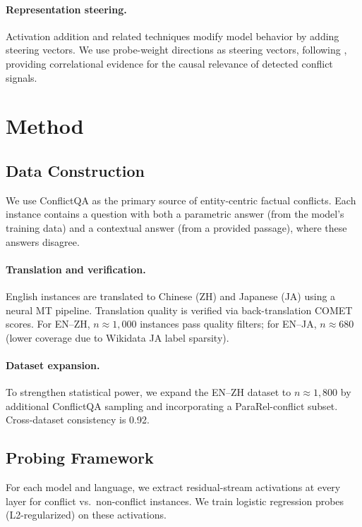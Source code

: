 \documentclass{article}
\begin{document}
\paragraph{Representation steering.}
Activation addition \citep{turner2023activation} and related techniques modify model behavior by adding steering vectors. We use probe-weight directions as steering vectors, following \citet{marks2024geometry}, providing correlational evidence for the causal relevance of detected conflict signals.

\section{Method}
\label{sec:method}

\subsection{Data Construction}

We use ConflictQA \citep{xie2024adaptive} as the primary source of entity-centric factual conflicts. Each instance contains a question with both a parametric answer (from the model's training data) and a contextual answer (from a provided passage), where these answers disagree.

\paragraph{Translation and verification.}
English instances are translated to Chinese (ZH) and Japanese (JA) using a neural MT pipeline. Translation quality is verified via back-translation COMET scores. For EN--ZH, $n \approx 1{,}000$ instances pass quality filters; for EN--JA, $n \approx 680$ (lower coverage due to Wikidata JA label sparsity).

\paragraph{Dataset expansion.}
To strengthen statistical power, we expand the EN--ZH dataset to $n \approx 1{,}800$ by additional ConflictQA sampling and incorporating a ParaRel-conflict subset. Cross-dataset consistency is 0.92.

\subsection{Probing Framework}

For each model and language, we extract residual-stream activations at every layer for conflict vs.\ non-conflict instances. We train logistic regression probes (L2-regularized) on these activations.
\end{document}
